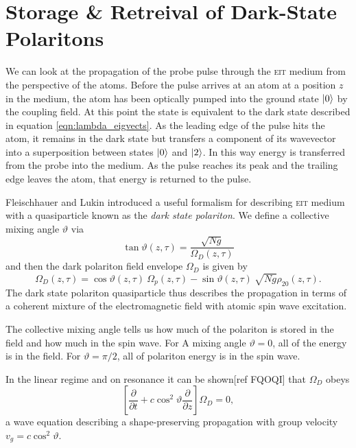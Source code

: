 \section{Storage \& Retreival of Dark-State Polaritons}
  \label{sec:polaritons_storage}

    We can look at the propagation of the probe pulse through the \textsc{eit}
    medium from the perspective of the atoms. Before the pulse arrives at an
    atom at a position $z$ in the medium, the atom has been optically pumped
    into the ground state $\Ket{0}$ by the coupling field. At this point the
    state is equivalent to the dark state described in equation
    \ref{eqn:lambda_eigvects}. As the leading edge of the pulse hits the atom,
    it remains in the dark state but transfers a component of its wavevector
    into a superposition between states $\Ket{0}$ and $\Ket{2}$. In this way
    energy is transferred from the probe into the medium. As the pulse reaches
    its peak and the trailing edge leaves the atom, that energy is returned to
    the pulse.

    Fleischhauer and Lukin introduced a useful formalism for describing
    \textsc{eit} medium with a quasiparticle known as the \textit{dark state
    polariton}. We define a collective mixing angle $\vartheta$ via
    \begin{equation}
      \tan{\vartheta}(z, \tau) = \frac{\sqrt{Ng}}{\Omega_D(z, \tau)}
    \end{equation}
    and then the dark polariton field envelope $\Omega_D$ is given by
    \begin{equation}
      \Omega_D(z,\tau) = \cos{\vartheta}(z, \tau)~\Omega_p(z, \tau) - 
        \sin{\vartheta}(z, \tau) ~ \sqrt{Ng} \rho_{20}(z, \tau).
    \end{equation}
    The dark state polariton quasiparticle thus describes the propagation in
    terms of a coherent mixture of the electromagnetic field with atomic spin
    wave excitation. 

    The collective mixing angle tells us how much of the polariton is stored in
    the field and how much in the spin wave. For A mixing angle $\vartheta = 0$,
    all of the energy is in the field. For $\vartheta = \pi/2$, all of polariton
    energy is in the spin wave.
    
    In the linear regime and on resonance it can be shown[ref FQOQI] that
    $\Omega_D$ obeys 
    \begin{equation}
      \left[ \frac{\partial}{\partial t} + c \cos^2 \vartheta 
      \frac{\partial}{\partial z} \right] \Omega_D = 0,
    \end{equation}
    a wave equation describing a shape-preserving propagation with group
    velocity $v_g = c \cos^2 \vartheta$.

